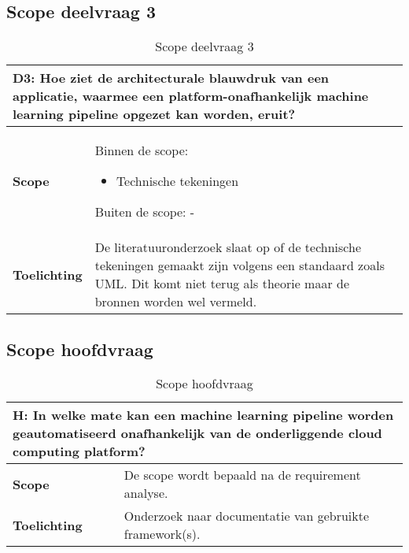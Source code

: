 \subsection*{Scope deelvraag 3}\label{appendix:scope-subquestion-3}
\begin{table}[hbt!]
  \centering
  \begin{tabular}{|p{.215\linewidth}|p{.72\linewidth}|}
  \hline
  \multicolumn{2}{|p{.97\linewidth}|}{\textbf{D3: Hoe ziet de architecturale blauwdruk van een applicatie, waarmee een platform-onafhankelijk machine learning pipeline opgezet kan worden, eruit?}} \\ \hline
    \textbf{Scope}&
      Binnen de scope:
      \begin{itemize}
        \item Technische tekeningen
      \end{itemize}
      Buiten de scope:
      -
    \\ \hline
    \textbf{Toelichting}&
      De literatuuronderzoek slaat op of de technische tekeningen gemaakt zijn volgens een standaard zoals UML. Dit komt niet terug als theorie maar de bronnen worden wel vermeld.
    \\ \hline
  \end{tabular}
  \caption{Scope deelvraag 3}
  \label{table:scope-subquestion-3}
\end{table}

\newpage

\subsection*{Scope hoofdvraag}\label{appendix:scope-main-question}
\begin{table}[hbt!]
  \centering
  \begin{tabular}{|p{.215\linewidth}|p{.72\linewidth}|}
  \hline
  \multicolumn{2}{|p{.97\linewidth}|}{\textbf{H: In welke mate kan een machine learning pipeline worden geautomatiseerd onafhankelijk van de onderliggende cloud computing platform?}} \\ \hline
    \textbf{Scope}&
      De scope wordt bepaald na de requirement analyse.
    \\ \hline
    \textbf{Toelichting}&
      Onderzoek naar documentatie van gebruikte framework(s).
    \\ \hline
  \end{tabular}
  \caption{Scope hoofdvraag}
  \label{table:scope-main-question}
\end{table}

\newpage